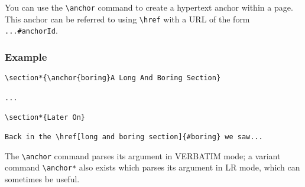 You can use the \verb|\anchor| command to create a hypertext anchor
within a page. This anchor can be referred to using \verb|\href| with a URL of
the form \verb|...#anchorId|.

\subsubsection*{Example}

\begin{verbatim}
\section*{\anchor{boring}A Long And Boring Section}

...

\section*{Later On}

Back in the \href[long and boring section]{#boring} we saw...
\end{verbatim}

The \verb|\anchor| command parses its argument in VERBATIM mode; a variant
command \verb|\anchor*| also exists which parses its argument in LR mode,
which can sometimes be useful.
